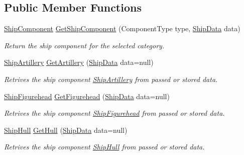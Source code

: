 \subsection*{Public Member Functions}
\begin{DoxyCompactItemize}
\item 
\hyperlink{class_skyrates_1_1_client_1_1_ship_1_1_ship_component}{Ship\-Component} \hyperlink{class_skyrates_1_1_client_1_1_ship_1_1_ship_builder_ab33531b8d3ab8ea2483a10bf0ae7d08a}{Get\-Ship\-Component} (Component\-Type type, \hyperlink{class_ship_data}{Ship\-Data} data)
\begin{DoxyCompactList}\small\item\em Return the ship component for the selected category. \end{DoxyCompactList}\item 
\hyperlink{class_skyrates_1_1_client_1_1_ship_1_1_ship_artillery}{Ship\-Artillery} \hyperlink{class_skyrates_1_1_client_1_1_ship_1_1_ship_builder_a731fa8b5e65cb34bfc2d8a7ce1375820}{Get\-Artillery} (\hyperlink{class_ship_data}{Ship\-Data} data=null)
\begin{DoxyCompactList}\small\item\em Retrives the ship component \hyperlink{class_skyrates_1_1_client_1_1_ship_1_1_ship_artillery}{Ship\-Artillery} from passed or stored data. \end{DoxyCompactList}\item 
\hyperlink{class_skyrates_1_1_client_1_1_ship_1_1_ship_figurehead}{Ship\-Figurehead} \hyperlink{class_skyrates_1_1_client_1_1_ship_1_1_ship_builder_a90dcdabb433c34752b8eaa1462e93bcb}{Get\-Figurehead} (\hyperlink{class_ship_data}{Ship\-Data} data=null)
\begin{DoxyCompactList}\small\item\em Retrives the ship component \hyperlink{class_skyrates_1_1_client_1_1_ship_1_1_ship_figurehead}{Ship\-Figurehead} from passed or stored data. \end{DoxyCompactList}\item 
\hyperlink{class_skyrates_1_1_client_1_1_ship_1_1_ship_hull}{Ship\-Hull} \hyperlink{class_skyrates_1_1_client_1_1_ship_1_1_ship_builder_ae2c2bae13bb9838f890cea59146b9c08}{Get\-Hull} (\hyperlink{class_ship_data}{Ship\-Data} data=null)
\begin{DoxyCompactList}\small\item\em Retrives the ship component \hyperlink{class_skyrates_1_1_client_1_1_ship_1_1_ship_hull}{Ship\-Hull} from passed or stored data. \end{DoxyCompactList}\item 

\end{DoxyCompactItemize}
